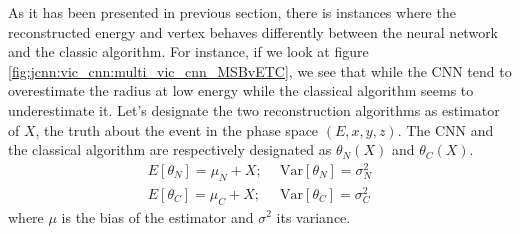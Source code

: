 \documentclass[../main.tex]{subfiles}
\begin{document}

As it has been presented in previous section, there is instances where the reconstructed energy and vertex behaves differently between the neural network and  the classic algorithm. For instance, if we look at figure \ref{fig:jcnn:vic_cnn:multi_vic_cnn_MSBvETC}, we see that while the CNN tend to overestimate the radius at low energy while the classical algorithm seems to underestimate it. Let's designate the two reconstruction algorithms as estimator of $X$, the truth about the event in the phase space $(E, x, y, z)$. The CNN and the classical algorithm are respectively designated as $\theta_{N}(X)$ and $\theta_{C}(X)$.
\begin{align}
  E[\theta_{N}] = \mu_N + X; ~&~ \mathrm{Var}[\theta_{N}] = \sigma^2_{N} \\
  E[\theta_{C}] = \mu_C + X; ~&~ \mathrm{Var}[\theta_{C}] = \sigma^2_{C}
\end{align}
where $\mu$ is the bias of the estimator and $\sigma^2$ its variance.
\end{document}
